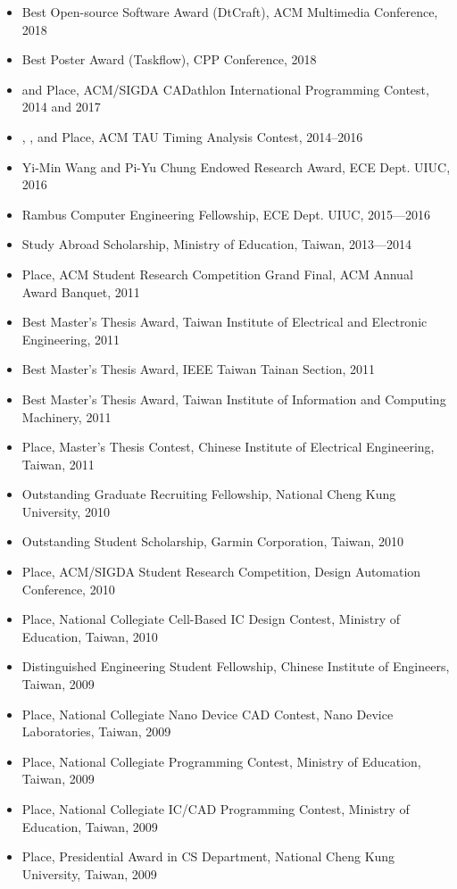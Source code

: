 \documentclass[A4,11pt]{article}
\begin{document}
\begin{itemize}
    \item Best Open-source Software Award (DtCraft), ACM Multimedia Conference, 2018
    \item Best Poster Award (Taskflow), CPP Conference, 2018
    \item {} and  Place, ACM/SIGDA CADathlon International Programming Contest, 2014 and 2017
    \item {}, , and  Place, ACM TAU Timing Analysis Contest, 2014--2016
    \item Yi-Min Wang and Pi-Yu Chung Endowed Research Award, ECE Dept. UIUC, 2016
    \item Rambus Computer Engineering Fellowship, ECE Dept. UIUC, 2015—2016
    \item Study Abroad Scholarship, Ministry of Education, Taiwan, 2013—2014
    \item {} Place, ACM Student Research Competition Grand Final, ACM Annual Award Banquet, 2011
    \item Best Master’s Thesis Award, Taiwan Institute of Electrical and Electronic Engineering, 2011
    \item Best Master’s Thesis Award, IEEE Taiwan Tainan Section, 2011
    \item Best Master’s Thesis Award, Taiwan Institute of Information and Computing Machinery, 2011
    \item {} Place, Master’s Thesis Contest, Chinese Institute of Electrical Engineering, Taiwan, 2011
    \item Outstanding Graduate Recruiting Fellowship, National Cheng Kung University, 2010
    \item Outstanding Student Scholarship, Garmin Corporation, Taiwan, 2010
    \item {} Place, ACM/SIGDA Student Research Competition, Design Automation Conference, 2010
    \item {} Place, National Collegiate Cell-Based IC Design Contest, Ministry of Education, Taiwan, 2010
    \item Distinguished Engineering Student Fellowship, Chinese Institute of Engineers, Taiwan, 2009
    \item {} Place, National Collegiate Nano Device CAD Contest, Nano Device Laboratories, Taiwan, 2009
    \item {} Place, National Collegiate Programming Contest, Ministry of Education, Taiwan, 2009
    \item {} Place, National Collegiate IC/CAD Programming Contest, Ministry of Education, Taiwan, 2009
    \item {} Place, Presidential Award in CS Department, National Cheng Kung University, Taiwan, 2009

 \end{itemize}
\end{document}
